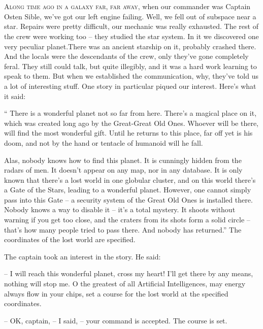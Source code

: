 \documentclass[ebook,oneside,final,openright]{memoir}
\begin{document}
\chapter{}
\par
\lettrine{A}{long time ago in a galaxy far, far away,} when our commander was Captain Osten Sible, we’ve got our left engine failing. Well, we fell out of subspace near a star. Repairs were pretty difficult, our mechanic was really exhausted. The rest of the crew were working too – they studied the star system. In it we discovered one very peculiar planet.There was an ancient starship on it, probably crashed there. And the locals were the descendants of the crew, only they’ve gone completely feral. They still could talk, but quite illegibly, and it was a hard work learning to speak to them. But when we established the communication, why, they’ve told us a lot of interesting stuff. One story in particular piqued our interest. Here’s what it said:\par
\par
“ There is a wonderful planet not so far from here. There’s a magical place on it, which was created long ago by the Great-Great Old Ones. Whoever will be there, will find the most wonderful gift. Until he returns to this place, far off yet is his doom, and not by the hand or tentacle of humanoid will he fall. \par
Alas, nobody knows how to find this planet. It is cunningly hidden from the radars of men. It doesn’t appear on any map, nor in any database. It is only known that there’s a lost world in one globular cluster, and on this world there’s a Gate of the Stars, leading to a wonderful planet. However, one cannot simply pass into this Gate – a security system of the Great Old Ones is installed there. Nobody knows a way to disable it – it’s a total mystery. It shoots without warning if you get too close, and the craters from its shots form a solid circle – that’s how many people tried to pass there. And nobody has returned.” The coordinates of the lost world are specified.\par
\par
The captain took an interest in the story. He said:\par
– I will reach this wonderful planet, cross my heart! I’ll get there by any means, nothing will stop me. O the greatest of all Artificial Intelligences, may energy always flow in your chips, set a course for the lost world at the specified coordinates.\par
– OK, captain, – I said, – your command is accepted. The course is set.\par
\end{document}
